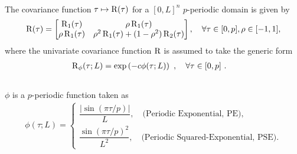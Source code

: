 \begin{frame}{}
 \\
The covariance function $\tau \mapsto \operatorname{R}(\tau)$ for a $[0, L]^n$ $p$-periodic domain is given by
\begin{align}
    \operatorname{R}(\tau) =
    \begin{bmatrix}
        \operatorname{R}_1(\tau) & \rho \operatorname{R}_1(\tau) \\
        \rho \operatorname{R}_1(\tau) & \rho^2 \operatorname{R}_1(\tau) + (1-\rho^2) \operatorname{R}_2(\tau)
    \end{bmatrix}, \quad \forall \tau \in [0,p], \rho \in [-1, 1],
\end{align}
where the univariate covariance function $\operatorname{R}$ is assumed to take the generic form
\begin{align}
    \operatorname{R}_\phi(\tau; L) & = \exp\left( -c \phi(\tau; L)\right )~, \quad \forall \tau \in [0,p]~.
\end{align} \\
$\phi$ is a $p$-periodic function taken as
\begin{align}
    \phi(\tau; L) =
    \begin{cases}
        \dfrac{|\sin\left( \pi\tau/p \right)|}{L}, \quad \text{(Periodic Exponential, PE),} \\
        \dfrac{\sin\left( \pi\tau/p \right)^2}{L^2}, \quad \text{(Periodic Squared-Exponential, PSE)}.
    \end{cases}
\end{align}
\end{frame}

\begin{frame}{}
\begin{columns}
    \begin{column}{0.7\textwidth}
         \\
        
    \end{column}
    \begin{column}{0.3\textwidth}
        \vspace{-2em}
        
    \end{column}
\end{columns}
\end{frame}

\begin{frame}{}
\begin{columns}
    \begin{column}{0.7\textwidth}
         \\
        
    \end{column}
    \begin{column}{0.3\textwidth}
        \vspace{-2em}
        
    \end{column}
\end{columns}
\end{frame}

